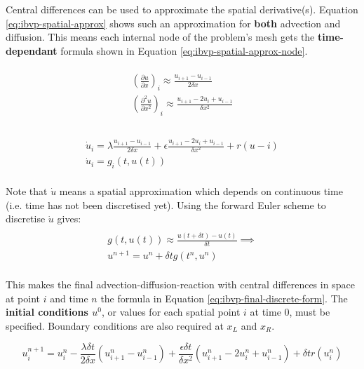 \documentclass{article}
\begin{document}
Central differences can be used to approximate the spatial derivative(s). Equation \ref{eq:ibvp-spatial-approx} shows such an approximation for \textbf{both} advection and diffusion. This means each internal node of the problem's mesh gets the \textbf{time-dependant} formula shown in Equation \ref{eq:ibvp-spatial-approx-node}.

\begin{multline} \\
	{\left( \frac{\partial u}{\partial x} \right)}_i \approx \frac{u_{i + 1} - u_{i - 1}}{2\delta x} \\
	{\left( \frac{\partial^2 u}{\partial x^2} \right)}_i \approx \frac{u_{i + 1} - 2u_i + u_{i - 1}}{\delta x^2} \\
	\label{eq:ibvp-spatial-approx}
\end{multline}

\begin{multline} \\
	\dot{u}_i = \lambda \frac{u_{i + 1} - u_{i - 1}}{2\delta x} + \epsilon \frac{u_{i + 1} - 2u_i + u_{i - 1}}{\delta x^2} + r(u-i) \\
	\dot{u}_i = g_i(t, u(t)) \\
	\label{eq:ibvp-spatial-approx-node}
\end{multline}

Note that $\dot{u}$ means a spatial approximation which depends on continuous time (i.e. time has not been discretised yet). Using the forward Euler scheme to discretise $\dot{u}$ gives:
\begin{multline}\\
	g(t, u(t)) \approx \frac{u(t + \delta t) - u(t)}{\delta t} \implies \\
	u^{n+1} = u^n + \delta t g(t^n, u^n) \\
\end{multline}

This makes the final advection-diffusion-reaction with central differences in space at point $i$ and time $n$ the formula in Equation \ref{eq:ibvp-final-discrete-form}. The \textbf{initial conditions $u^0$}, or values for each spatial point $i$ at time $0$, must be specified. Boundary conditions are also required at $x_L$ and $x_R$.

\begin{equation}
	u_i^{n+1} = u_i^n - \frac{\lambda \delta t}{2 \delta x}(u_{i+1}^n - u_{i-1}^n) + \frac{\epsilon \delta t}{\delta x^2}(u_{i+1}^n - 2u_i^n + u_{i-1}^n) + \delta tr(u_i^n)
	\label{eq:ibvp-final-discrete-form}
\end{equation}
\end{document}
